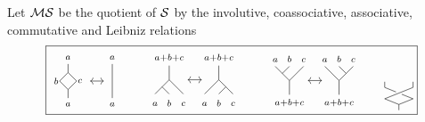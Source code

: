 \begin{definition} \label{definition: MS}
	Let $\MS$ be the quotient of $\S$ by the involutive, coassociative, associative, commutative and Leibniz relations
	\begin{equation*}
	\boxed{
		\begin{tikzpicture}[scale=.48]
		\path[draw] (0,0)--(0,.5)--(-.5,1)--(0,1.5)--(0,2);
		\path[draw] (0,.5)--(.5,1)--(0,1.5);
		\node[below] at (0,0){$\scriptstyle a$};
		\node[above] at (0,2){$\scriptstyle a$};
		
		\node at (-.7,1) {$\scriptstyle b$};
		\node at (.7,1) {$\scriptstyle c$};
		
		\draw[<->] (1.3,1)--(2.1,1);
		
		\draw (2.6,2)--(2.6,0);
		
		\node[below] at (2.6,0){$\scriptstyle a$};
		\node[above] at (2.6,2){$\scriptstyle a$};
		\end{tikzpicture}	
		\qquad \
		\begin{tikzpicture}[scale=.4]
		\path[draw] (0,0)--(0,-1)--(-1,-2);
		\draw (0,-1)--(1,-2);
		\draw (-.5,-1.5)--(0,-2);
		
		\node[above] at (0,0){$\scriptstyle a+b+c$};
		\node at (-1,-2.7){$\scriptstyle a$};
		\node at (0,-2.65){$\scriptstyle b$};
		\node at (1,-2.7){$\scriptstyle c$};
		
		\draw[<->] (1.3,-1)--(2.3,-1);
		
		\path[draw] (3.5,0)--(3.5,-1)--(2.5,-2);
		\draw (3.5,-1)--(4.5,-2);
		\draw (4,-1.5)--(3.5,-2);
		
		\node[above] at (3.5,0){$\scriptstyle a+b+c$};
		\node at (2.5,-2.7){$\scriptstyle a$};
		\node at (3.5,-2.65){$\scriptstyle b$};
		\node at (4.5,-2.7){$\scriptstyle c$};
		\end{tikzpicture}
		\qquad \ 
		\begin{tikzpicture}[scale=.4]
		\path[draw] (0,0)--(0,1)--(-1,2);
		\draw (0,1)--(1,2);
		\draw (-.5,1.5)--(0,2);
		
		\node[below] at (0,0){$\scriptstyle a+b+c$};
		\node[above] at (-1,2){$\scriptstyle a$};
		\node[above] at (0,2){$\scriptstyle b$};
		\node[above] at (1,2){$\scriptstyle c$};
		
		\draw[<->] (1.3,1)--(2.3,1);
		
		\path[draw] (3.5,0)--(3.5,1)--(2.5,2);
		\draw (3.5,1)--(4.5,2);
		\draw (4,1.5)--(3.5,2);
		
		\node[below] at (3.5,0){$\scriptstyle a+b+c$};
		\node[above] at (2.5,2){$\scriptstyle a$};
		\node[above] at (3.5,2){$\scriptstyle b$};
		\node[above] at (4.5,2){$\scriptstyle c$};
		\end{tikzpicture}
		\qquad
		\begin{tikzpicture}[scale=.4]
		\path[draw] (0,0)--(0,0.4)--(-1,.8)--(1,1.6)--(1,2);
		\path[draw] (0,0.4)--(1,.8)--(0.2,1.12);
		\path[draw] (-0.2,1.28)--(-1,1.6)--(-1,2);
		

\end{tikzpicture}}
\end{equation*}
\end{definition}
